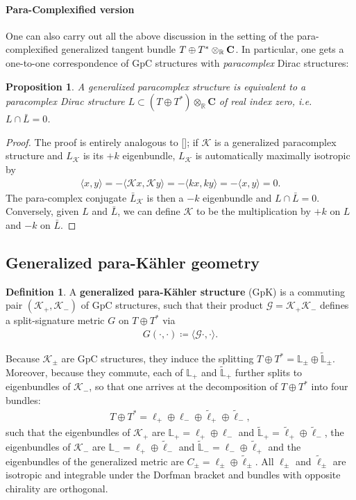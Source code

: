 \documentclass{article}
\newcommand{\TT}{{T\oplus T^*}}
\newcommand{\KK}{\mathcal{K}}
\newcommand{\GG}{\mathcal{G}}
\newcommand{\RR}{\mathbb{R}}
\newcommand{\Lb}{\mathbb{L}}
\newcommand{\ellt}{{\tl{\ell}}}
\newcommand{\la}{\langle}
\newcommand{\ra}{\rangle}
\def\tl{\tilde}
\newtheorem{proposition}[theorem]{Proposition}
\theoremstyle{definition}
\newtheorem{Def}[theorem]{Definition}
\theoremstyle{remark}
\begin{document}
\paragraph{Para-Complexified version}
One can also carry out all the above discussion in the setting of the para-complexified generalized tangent bundle $\TT\otimes_\RR \Cp$. In particular, one gets a one-to-one correspondence of GpC structures with {\it paracomplex} Dirac structures:
\begin{proposition}
A generalized paracomplex structure is equivalent to a paracomplex Dirac structure $L \subset (\TT)\otimes_\mathbb{R} \mathbf{C}$ of real index zero, i.e. $L \cap \bar{L}=0$.
\end{proposition}
\begin{proof}
The proof is entirely analogous to []; if $\KK$ is a generalized paracomplex structure and $L_\KK$ is its $+k$ eigenbundle, $L_\KK$ is automatically maximally isotropic by 
\begin{align*}
\langle x,y \rangle = -\langle\KK x,\KK y \rangle = -\langle k x,k y \rangle = -\langle x,y\rangle=0.
\end{align*}
The para-complex conjugate $\bar{L}_\KK$ is then a $-k$ eigenbundle and $L\cap\bar{L}=0$. Conversely, given $L$ and $\bar{L}$, we can define $\KK$ to be the multiplication by $+k$ on $L$ and $-k$ on $\bar{L}$.
\end{proof}

\subsection{Generalized para-K\"ahler geometry}\label{sec:GpK}
\begin{Def}
A \textbf{generalized para-K\"ahler structure} (GpK) is a commuting pair $(\KK_+,\KK_-)$ of GpC structures, such that their product $\GG=\KK_+\KK_-$ defines a split-signature metric $G$ on $\TT$ via
\begin{align*}
G(\cdot,\cdot)\coloneqq \la \GG\cdot,\cdot\ra.
\end{align*}
\end{Def}

Because $\KK_\pm$ are GpC structures, they induce the splitting $\TT= \Lb_\pm\oplus\widetilde{\Lb}_\pm$. Moreover, because they commute, each of $\Lb_+$ and $\widetilde{\Lb}_+$ further splits to eigenbundles of $\KK_-$, so that one arrives at the decomposition of $\TT$ into four bundles:
\begin{align}\label{GpK_bundles}
\TT=\ell_+\oplus\ell_-\oplus \ellt_+\oplus \ellt_-,
\end{align}
such that the eigenbundles of $\KK_+$ are $\Lb_+=\ell_+\oplus\ell_-$ and $\tl{\Lb}_+=\ellt_+\oplus \ellt_-$, the eigenbundles of $\KK_-$ are $\Lb_-=\ell_+\oplus\ellt_-$ and $\tl{\Lb}_-=\ell_-\oplus \ellt_+$ and the eigenbundles of the generalized metric are $C_\pm=\ell_\pm\oplus\ellt_\pm$. All $\ell_\pm$ and $\ellt_\pm$ are isotropic and integrable under the Dorfman bracket \cite{Hu:2019zro} and bundles with opposite chirality are orthogonal.
\end{document}
